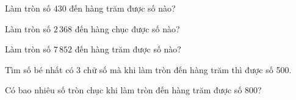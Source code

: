 \begin{ex} %
Làm tròn số $430$ đến hàng trăm được số nào?
\end{ex}

\begin{ex} %
Làm tròn số $2\,368$ đến hàng chục được số nào?
\end{ex}

\begin{ex} %
Làm tròn số $7\,852$ đến hàng trăm được số nào?
\end{ex}

\begin{ex} %
Tìm số bé nhất có 3 chữ số mà khi làm tròn đến hàng trăm thì được số 500.
\end{ex}

\begin{ex} %
Có bao nhiêu số tròn chục khi làm tròn đến hàng trăm được số 800?
\end{ex}

